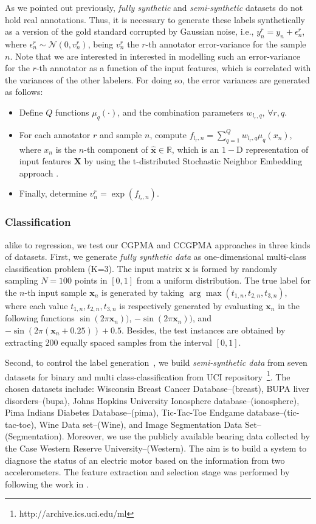 \documentclass[journal]{IEEEtran}
\providecommand{\ve}[1]{{\bm{#1}}}%
\providecommand{\mat}[1]{{\bm{#1}}} %
\newcommand{\Real}{\mathbb{R}}
\providecommand{\ve}[1]{{\mathbf{#1}}}
\providecommand{\mat}[1]{{\mathbf{#1}}}
\newcommand{\gauss}{\mathcal{N}} %
\begin{document}
As we pointed out previously, \textit{fully synthetic} and \textit{semi-synthetic} datasets do not hold real annotations. Thus, it is necessary to generate these labels synthetically as a version of the gold standard corrupted by Gaussian noise, i.e., $y_n^r = y_n +\epsilon^r_{n}$, where $\epsilon^r_{n}\sim \gauss(0, v^r_{n})$, being $v^r_{n}$ the $r$-th annotator error-variance for the sample $n$. Note that we are interested in interested in modelling such an error-variance for the $r$-th annotator as a function of the input features, which is correlated with the variances of the other labelers. For doing so, the error variances are generated as follows:
\begin{itemize}
    \item Define $Q$ functions $\mu_q(\cdot)$, and the combination parameters $w_{l_r,q},\,\forall r, q$.
    \item For each annotator $r$ and sample $n$, compute $f_{l_r,n} = \sum_{q=1}^{Q}w_{l_r,q}\mu_q(x_n)$, where $x_n$ is the $n$-th component of $\hat{\ve{x}}\in \Real$, which is an $1-$D representation of input features $\mat{X}$ by using the t-distributed Stochastic Neighbor Embedding approach \cite{maaten2008visualizing}.
    \item Finally, determine $v^r_n = \exp(f_{l_r,n})$. 
\end{itemize}

\subsubsection{Classification}\label{sec:datasetsCla}
alike to regression, we test our CGPMA and CCGPMA approaches in three kinds of datasets. First, we generate \textit{fully synthetic data} as one-dimensional multi-class classification problem (K=3). The input matrix $\ve{x}$ is formed by randomly sampling $N=100$ points in $[0,1]$ from a uniform distribution. The true label for the $n$-th input sample $\ve{x}_n$ is generated by taking $\arg \max (t_{1,n}, t_{2,n}, t_{3,n})$, where each value $t_{1,n}, t_{2,n}, t_{3,n}$ is respectively generated by evaluating $\ve{x}_n$ in the following functions $\sin(2\pi\ve{x}_n))$, $-\sin(2\pi\ve{x}_n))$, and $-\sin(2\pi(\ve{x}_n+0.25))+0.5$. Besides, the test instances are obtained by extracting $200$ equally spaced samples from the interval $[0,1]$.

Second, to control the label generation~\cite{ruiz2019learning}, we build \textit{semi-synthetic data} from seven datasets for  binary and multi class-classification from {UCI repository}~\footnote{http://archive.ics.uci.edu/ml}.
The chosen datasets include: {Wisconsin Breast Cancer Database}--(breast), {BUPA liver disorders}--(bupa), {Johns Hopkins University Ionosphere database}--(ionosphere), {Pima Indians Diabetes Database}--(pima), {Tic-Tac-Toe Endgame database}--(tic-tac-toe), {Wine Data set}--(Wine), and {Image Segmentation Data Set}--(Segmentation). Moreover, we use the publicly available bearing data collected by the Case Western Reserve University--(Western). The aim is to build a system to diagnose the status of an electric motor based on the information from two accelerometers. The feature extraction and selection stage was performed by following the work in \cite{hernandez2020bearing}.
\end{document}
